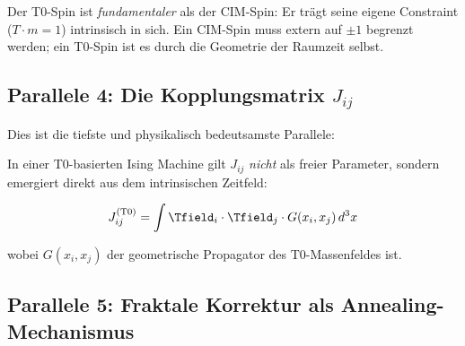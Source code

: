 \begin{important}[Fundamentalunterschied]
    Der T0-Spin ist \emph{fundamentaler} als der CIM-Spin: Er trägt seine eigene 
    Constraint ($T \cdot m = 1$) intrinsisch in sich. Ein CIM-Spin muss extern auf 
    $\pm 1$ begrenzt werden; ein T0-Spin ist es durch die Geometrie der Raumzeit selbst.
\end{important}

\subsection{Parallele 4: Die Kopplungsmatrix $J_{ij}$}
\label{subsec:coupling}

Dies ist die tiefste und physikalisch bedeutsamste Parallele:

\begin{table}[h]
    \centering
    \caption{Parallele 4: Kopplungsmatrix -- der entscheidende Unterschied}
    \label{tab:parallel4}
\end{table}

In einer T0-basierten Ising Machine gilt $J_{ij}$ \emph{nicht} als freier Parameter, 
sondern emergiert direkt aus dem intrinsischen Zeitfeld:

\begin{equation}
    J_{ij}^{(\text{T0})} = \int \Tfield_i \cdot \Tfield_j \cdot G(x_i, x_j) \, d^3x
    \label{eq:t0_coupling}
\end{equation}

wobei $G(x_i, x_j)$ der geometrische Propagator des T0-Massenfeldes ist.

\subsection{Parallele 5: Fraktale Korrektur als Annealing-Mechanismus}

